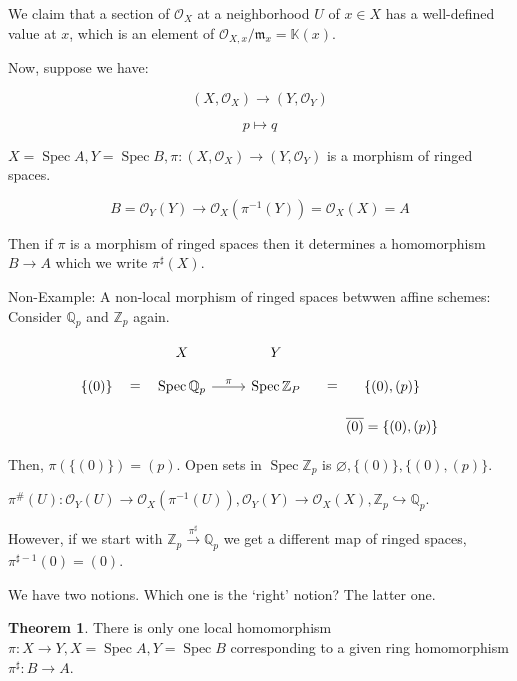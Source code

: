 \documentclass{article}
\theoremstyle{definition}
\newtheorem{theorem}{Theorem}
\begin{document}
    We claim that a section of \(\mathcal{O} _X\) at a neighborhood \(U\) of \(x\in X\) has a well-defined value at \(x\), which is an element of \(\mathcal{O}_{X,x} / \mathfrak{m}_x = \mathbb{K} (x)\).

    Now, suppose we have:

    \[
        (X, \mathcal{O}_X) \to (Y, \mathcal{O} _Y)
    \]
    
    \[
        p \mapsto q
    \]

    \(X = \operatorname{Spec} A, Y = \operatorname{Spec} B, \pi : (X,\mathcal{O}_X) \to (Y, \mathcal{O}_Y)\) is a morphism of ringed spaces.

    \[
        B = \mathcal{O}_Y(Y) \to \mathcal{O}_X(\pi ^{-1} (Y)) = \mathcal{O}_X(X) = A
    \]

    Then if \(\pi\) is a morphism of ringed spaces then it determines a homomorphism \(B \to A\) which we write \(\pi^\sharp (X)\).

    Non-Example: A non-local morphism of ringed spaces betwwen affine schemes: Consider \(\mathbb{Q}_p\) and \(\mathbb{Z}_p\) again.

    \[
        \begin{tikzcd}[row sep=small]
            & X & Y & \\
            \{ (0) \} \ar[r,"=", phantom] & \operatorname{Spec} \mathbb{Q}_p \ar[r,"\pi"] & \operatorname{Spec} \mathbb{Z}_P \ar[r,"=",phantom] & \{ (0), (p) \} \\ & & & \overline{(0)} = \{ (0), (p) \}  
        \end{tikzcd}
    \]

    Then, \(\pi (\{ (0) \}) = (p)\). Open sets in \(\operatorname{Spec} \mathbb{Z}_p\) is \(\varnothing , \{ (0) \} , \{ (0),(p) \} \).
    
    \(\pi^\#(U) : \mathcal{O}_Y(U) \to \mathcal{O}_X(\pi ^{-1} (U)), \mathcal{O}_Y(Y) \to \mathcal{O}_X(X), \mathbb{Z}_p \hookrightarrow \mathbb{Q}_p\).

    However, if we start with \(\mathbb{Z}_p \xrightarrow{\pi^\sharp} \mathbb{Q}_p\) we get a different map of ringed spaces, \(\pi^{\sharp - 1}(0) = (0)\).
    
    We have two notions. Which one is the `right' notion? The latter one.

    \begin{theorem}
        There is only one local homomorphism \(\pi : X \to Y, X = \operatorname{Spec} A, Y = \operatorname{Spec} B\) corresponding to a given ring homomorphism \(\pi^\sharp : B \to A\).
    \end{theorem}
\end{document}
